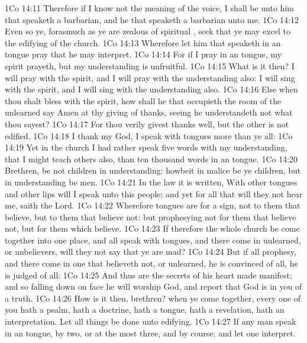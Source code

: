 \vs 1Co 14:11 Therefore if I know not the meaning of the voice, I shall be unto him that speaketh a barbarian, and he that speaketh  a barbarian unto me.
\vs 1Co 14:12 Even so ye, forasmuch as ye are zealous of spiritual , seek that ye may excel to the edifying of the church.
\vs 1Co 14:13 Wherefore let him that speaketh in an  tongue pray that he may interpret.
\vs 1Co 14:14 For if I pray in an  tongue, my spirit prayeth, but my understanding is unfruitful.
\vs 1Co 14:15 What is it then? I will pray with the spirit, and I will pray with the understanding also: I will sing with the spirit, and I will sing with the understanding also.
\vs 1Co 14:16 Else when thou shalt bless with the spirit, how shall he that occupieth the room of the unlearned say Amen at thy giving of thanks, seeing he understandeth not what thou sayest?
\vs 1Co 14:17 For thou verily givest thanks well, but the other is not edified.
\vs 1Co 14:18 I thank my God, I speak with tongues more than ye all:
\vs 1Co 14:19 Yet in the church I had rather speak five words with my understanding, that  I might teach others also, than ten thousand words in an  tongue.
\vs 1Co 14:20 Brethren, be not children in understanding: howbeit in malice be ye children, but in understanding be men.
\vs 1Co 14:21 In the law it is written, With  other tongues and other lips will I speak unto this people; and yet for all that will they not hear me, saith the Lord.
\vs 1Co 14:22 Wherefore tongues are for a sign, not to them that believe, but to them that believe not: but prophesying  not for them that believe not, but for them which believe.
\vs 1Co 14:23 If therefore the whole church be come together into one place, and all speak with tongues, and there come in  unlearned, or unbelievers, will they not say that ye are mad?
\vs 1Co 14:24 But if all prophesy, and there come in one that believeth not, or  unlearned, he is convinced of all, he is judged of all:
\vs 1Co 14:25 And thus are the secrets of his heart made manifest; and so falling down on  face he will worship God, and report that God is in you of a truth.
\vs 1Co 14:26 How is it then, brethren? when ye come together, every one of you hath a psalm, hath a doctrine, hath a tongue, hath a revelation, hath an interpretation. Let all things be done unto edifying.
\vs 1Co 14:27 If any man speak in an  tongue,  by two, or at the most  three, and  by course; and let one interpret.
